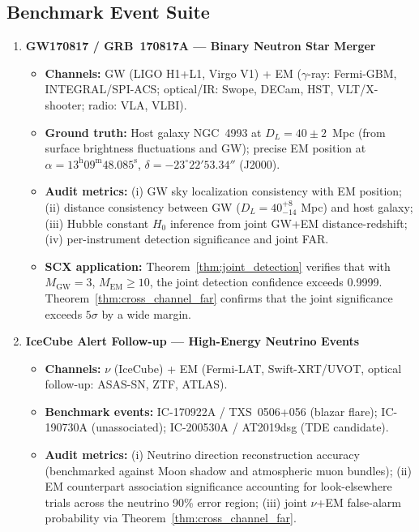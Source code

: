 \documentclass[11pt,a4paper]{article}
\theoremstyle{definition}
\newcommand{\SCX}{\textsc{SCX}}
\begin{document}
\subsection{Benchmark Event Suite}
\begin{enumerate}[label=\textbf{BM\arabic*:}, leftmargin=*]
    \item \textbf{GW170817 / GRB~170817A --- Binary Neutron Star Merger}
    \begin{itemize}
        \item \textbf{Channels:} GW (LIGO H1+L1, Virgo V1) + EM ($\gamma$-ray: Fermi-GBM, INTEGRAL/SPI-ACS; optical/IR: Swope, DECam, HST, VLT/X-shooter; radio: VLA, VLBI).
        \item \textbf{Ground truth:} Host galaxy NGC~4993 at $D_L = 40 \pm 2$~Mpc (from surface brightness fluctuations and GW); precise EM position at $\alpha = 13^{\mathrm{h}}09^{\mathrm{m}}48.085^{\mathrm{s}}$, $\delta = -23^\circ22'53.34''$ (J2000).
        \item \textbf{Audit metrics:} (i) GW sky localization consistency with EM position; (ii) distance consistency between GW ($D_L = 40^{+8}_{-14}$ Mpc) and host galaxy; (iii) Hubble constant $H_0$ inference from joint GW+EM distance-redshift; (iv) per-instrument detection significance and joint FAR.
        \item \textbf{\SCX{} application:} Theorem~\ref{thm:joint_detection} verifies that with $M_{\mathrm{GW}} = 3$, $M_{\mathrm{EM}} \geq 10$, the joint detection confidence exceeds 0.9999. Theorem~\ref{thm:cross_channel_far} confirms that the joint significance exceeds $5\sigma$ by a wide margin.
    \end{itemize}
    \item \textbf{IceCube Alert Follow-up --- High-Energy Neutrino Events}
    \begin{itemize}
        \item \textbf{Channels:} $\nu$ (IceCube) + EM (Fermi-LAT, Swift-XRT/UVOT, optical follow-up: ASAS-SN, ZTF, ATLAS).
        \item \textbf{Benchmark events:} IC-170922A / TXS~0506+056 (blazar flare); IC-190730A (unassociated); IC-200530A / AT2019dsg (TDE candidate).
        \item \textbf{Audit metrics:} (i) Neutrino direction reconstruction accuracy (benchmarked against Moon shadow and atmospheric muon bundles); (ii) EM counterpart association significance accounting for look-elsewhere trials across the neutrino 90\% error region; (iii) joint $\nu$+EM false-alarm probability via Theorem~\ref{thm:cross_channel_far}.

\end{itemize}
\end{enumerate}
\end{document}
